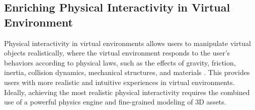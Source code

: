 \subsection{Enriching Physical Interactivity in Virtual Environment}
Physical interactivity in virtual environments allows users to manipulate virtual objects realistically, where the virtual environment responds to the user's behaviors according to physical laws, such as the effects of gravity, friction, inertia, collision dynamics, mechanical structures, and materials \cite{xie2024physgaussian,zhang2024physdreamer,10.1145/3641519.3657448,9879997}. This provides users with more realistic and intuitive experiences in virtual environments.
Ideally, achieving the most realistic physical interactivity requires the combined use of a powerful physics engine and fine-grained modeling of 3D assets.

